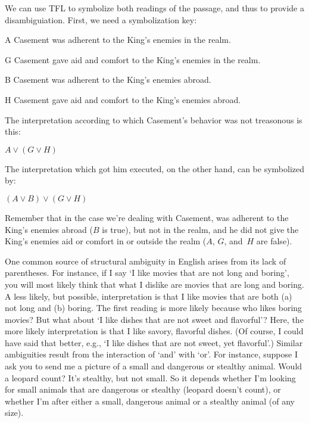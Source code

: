 We can use TFL to symbolize both readings of the passage, and thus to provide a disambiguiation. First, we need a symbolization key:
\begin{ekey}
	\item[A] Casement was adherent to the King's enemies in the realm.
	\item[G] Casement gave aid and comfort to the King's enemies in the realm.
	\item[B] Casement was adherent to the King's enemies abroad.
	\item[H] Casement gave aid and comfort to the King's enemies abroad.
\end{ekey}
The interpretation according to which Casement's behavior was not treasonous is this:
\begin{earg}
	\prem $A \lor (G \lor H)$
\end{earg} 
The interpretation which got him executed, on the other hand, can be symbolized by:
\begin{earg}
	\prem $(A \lor B) \lor (G \lor H)$
\end{earg}
Remember that in the case we're dealing with Casement, was adherent to the King's enemies abroad ($B$ is true), but not in the realm, and he did not give the King's enemies aid or comfort in or outside the realm ($A$, $G$, and~$H$ are false).

One common source of structural ambiguity in English arises from its lack of parentheses. For instance, if I say `I like movies that are not long and boring', you will most likely think that what I dislike are movies that are long and boring. A less likely, but possible, interpretation is that I like movies that are both (a) not long and (b) boring. The first reading is more likely because who likes boring movies? But what about `I like dishes that are not sweet and flavorful'? Here, the more likely interpretation is that I like savory, flavorful dishes.  (Of course, I could have said that better, e.g., `I like dishes that are not sweet, yet flavorful'.) Similar ambiguities result from the interaction of `and' with `or'. For instance, suppose I ask you to send me a picture of a small and dangerous or stealthy animal.  Would a leopard count? It's stealthy, but not small. So it depends whether I'm looking for small animals that are dangerous or stealthy (leopard doesn't count), or whether I'm after either a small, dangerous animal or a stealthy animal (of any size).

